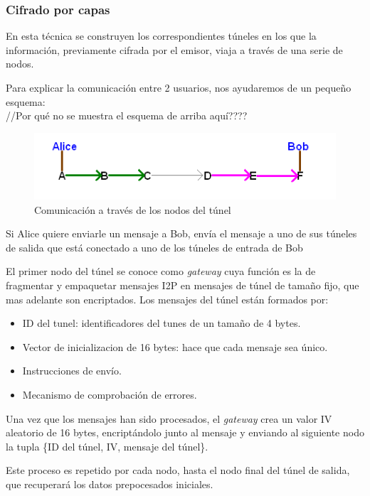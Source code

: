 \subsubsection*{Cifrado por capas}

En esta técnica se construyen los correspondientes túneles en los que la información, previamente cifrada por el emisor,  viaja a través de una serie de nodos.

Para explicar la comunicación entre 2 usuarios, nos ayudaremos de un pequeño esquema: \\

//Por qué no se muestra el esquema de arriba aquí???? \\

	
\begin{figure}
	\centering
	\includegraphics[width=.8\textwidth]{img/alice_bob_tunnel}
	\caption{Comunicación a través de los nodos del túnel}
\end{figure}

Si Alice quiere enviarle un mensaje a Bob, envía el mensaje a uno de sus túneles de salida que está conectado a uno de los túneles de entrada de Bob


El primer nodo del túnel se conoce como \textit{gateway} cuya función es la de fragmentar y empaquetar mensajes I2P en mensajes de túnel de tamaño fijo, que mas adelante son encriptados. 
Los mensajes del túnel están formados por:

\begin{itemize}
	\item ID del tunel: identificadores del tunes de un tamaño de 4 bytes.
	\item Vector de inicializacion de 16 bytes: hace que cada mensaje sea único.
	\item Instrucciones de envío.
	\item Mecanismo de comprobación de errores.
\end{itemize}

Una vez que los mensajes han sido procesados, el \textit{gateway} crea un valor IV aleatorio de 16 bytes, encriptándolo junto al mensaje y enviando al siguiente nodo la tupla \{ID del túnel, IV, mensaje del túnel\}. 

Este proceso es repetido por cada nodo, hasta el nodo final del túnel de salida, que recuperará los datos prepocesados iniciales.




